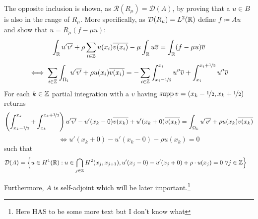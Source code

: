 The opposite inclusion is shown, as $\mathcal{R}(R_{\mu}) = \mathcal{D}(A)$, by proving that a $u \in B$ is also in the range of $R_{\mu}$. More specifically, as $\mathcal{D}(R_{\mu}) = L^{2}(\mathbb{R})$ define $f \coloneqq A u$ and show that $u = R_{\mu}(f - \mu u)$:
	\[ \int_{\mathbb{R}} u' \overline{v'} + \rho \sum_{i \in \mathbb{Z}} u(x_{i}) \overline{v(x_{i})} - \mu \int_{\mathbb{R}} u \overline{v}= \int_{\mathbb{R}}(f-\mu u) \overline{v} \]
	\[ \iff \sum_{i \in \mathbb{Z}} \int_{\Omega_{i}} u' \overline{v'} + \rho u(x_{i}) \overline{v(x_{i})} = - \sum_{i \in \mathbb{Z}} \int_{x_{i} - \nicefrac{1}{2}}^{x_{i}} u'' \overline{v} + \int_{x_{i}}^{x_{i} + \nicefrac{1}{2}} u'' \overline{v} \]
	For each $k \in \mathbb{Z}$ partial integration with a $v$ having $\operatorname{supp} v = (x_{k} - \nicefrac{1}{2}, x_{k} + \nicefrac{1}{2})$ returns
	\[ \left( \int_{x_{k} - \nicefrac{1}{2}}^{x_{k}} + \int_{x_{k}}^{x_{k} +\nicefrac{1}{2}} \right) u' \overline{v'} - u'(x_{k}-0) \overline{v(x_{k})}  + u'(x_{k}+0) \overline{v(x_{k})}  = \int_{\Omega_{k}} u' \overline{v'} + \rho u(x_{k}) \overline{v(x_{k})} \]
	\[ \iff u'(x_{k}+0) - u'(x_{k}-0) - \rho u(x_{k}) = 0 \]
	such that
	\begin{align*}
		\mathcal{D}(A) & = \Big\{ u \in H^{1}(\mathbb{R}): u \in \bigcap_{j \in \mathbb{Z}} H^{2}(x_{j} , x_{j+1}), u'(x_{j} - 0) - u'(x_{j} + 0) + \rho \cdot u(x_{j}) = 0 ~\forall j \in \mathbb{Z} \Big\}
	\end{align*}

Furthermore, $A$ is self-adjoint which will be later important.\footnote{Here HAS to be some more text but I don't know what}
\newpage %

